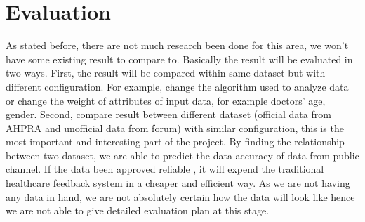 \documentclass[a4paper,11pt]{article}
\begin{document}
\section{Evaluation}
As stated before, there are not much research been done for this area, we won’t have some existing result to compare to. Basically the result will be evaluated in two ways. First, the result will be compared within same dataset but with different configuration. For example, change the algorithm used to analyze data or change the weight of attributes of input data, for example doctors’ age, gender. Second, compare result between different dataset (official data from AHPRA and unofficial data from forum) with similar configuration, this is the most important and interesting part of the project. By finding the relationship between two dataset, we are able to predict the data accuracy of data from public channel. If the data been approved reliable , it will expend the traditional healthcare feedback system in a cheaper and efficient way. As we are not having any data in hand,  we are not absolutely certain how the data will look like hence we are not able to give detailed evaluation plan at this stage.



\end{document}
